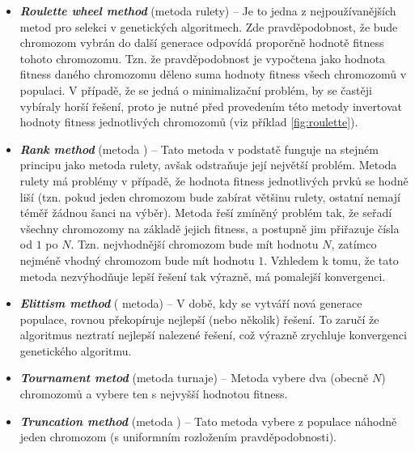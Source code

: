\begin{itemize}
    \item \textbf{\emph{Roulette wheel method}} (metoda rulety) -- Je to jedna z nejpoužívanějších metod pro selekci v genetických algoritmech. Zde pravděpodobnost, že bude chromozom vybrán do další generace odpovídá proporčně hodnotě fitness tohoto chromozomu. Tzn. že pravděpodobnost je vypočtena jako hodnota fitness daného chromozomu děleno suma hodnoty fitness všech chromozomů v populaci. V případě, že se jedná o minimalizační problém, by se častěji vybíraly horší řešení, proto je nutné před provedením této metody invertovat hodnoty fitness jednotlivých chromozomů (viz příklad \ref{fig:roulette}).
    \item \textbf{\emph{Rank method}} (metoda ) -- Tato metoda v podstatě funguje na stejném principu jako metoda rulety, avšak odstraňuje její největší problém. Metoda rulety má problémy v případě, že hodnota fitness jednotlivých prvků se hodně liší (tzn. pokud jeden chromozom bude zabírat většinu rulety, ostatní nemají téměř žádnou šanci na výběr). Metoda řeší zmíněný problém tak, že seřadí všechny chromozomy na základě jejich fitness, a postupně jim přiřazuje čísla od $1$ po $N$. Tzn. nejvhodnější chromozom bude mít hodnotu $N$, zatímco nejméně vhodný chromozom bude mít hodnotu $1$. Vzhledem k tomu, že tato metoda nezvýhodňuje lepší řešení tak výrazně, má pomalejší konvergenci.
    \item \textbf{\emph{Elittism method}} ( metoda) -- V době, kdy se vytváří nová generace populace, rovnou překopíruje nejlepší (nebo několik) řešení. To zaručí že algoritmus neztratí nejlepší nalezené řešení, což výrazně zrychluje konvergenci genetického algoritmu.
    \item \textbf{\emph{Tournament metod}} (metoda turnaje) -- Metoda vybere dva (obecně $N$) chromozomů a vybere ten s nejvyšší hodnotou fitness.
    \item \textbf{\emph{Truncation method}} (metoda ) -- Tato metoda vybere z populace náhodně jeden chromozom (s uniformním rozložením pravděpodobnosti).
\end{itemize}


